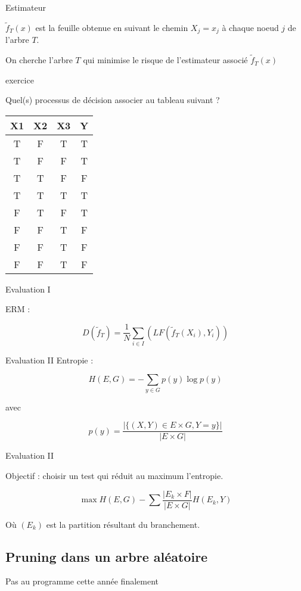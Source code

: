 \documentclass[11pt]{beamer}
\begin{document}
\begin{frame}{Estimateur}

$\tilde{f}_T(x)$ est la feuille obtenue en suivant le chemin $X_j=x_j$ à chaque noeud $j$ de l'arbre $T$.\\

\vspace{0.3cm}

On cherche l'arbre $T$ qui minimise le risque de l'estimateur associé $\tilde{f}_T(x)$

\end{frame}

\begin{frame}{exercice}

Quel(s) processus de décision associer au tableau suivant ?\\

\begin{center}
\vspace{0.2cm}
\begin{tabular}{|c|c|c|c|}
\hline
X1 & X2 & X3 & Y \\
\hline
T & F & T & T\\
T & F & F & T\\
T & T & F & F\\
T & T & T & T\\
F & T & F & T\\
F & F & T & F\\
F & F & T & F\\
F & F & T & F\\
\hline
\end{tabular}
\end{center}
\end{frame}

\begin{frame}{Evaluation I}

ERM : 

$$ D(\tilde{f}_T) = \frac{1}{N}\sum_{i \in I} \left( LF(\tilde{f}_T(X_i),Y_i) \right)$$

\end{frame}

\begin{frame}{Evaluation II}
Entropie :

$$ H(E,G) = - \sum_{y \in G}p(y)\log p(y)$$

avec 

$$p(y) = \frac{|\{(X,Y)\in E\times G,Y=y\}|}{|E\times G|}$$

\end{frame}

\begin{frame}{Evaluation II}

Objectif : choisir un test qui réduit au maximum l'entropie.

$$\max H(E,G) - \sum \frac{|E_k\times F|}{|E\times G|}H(E_k,Y)$$

Où $(E_k)$ est la partition résultant du branchement. 

\end{frame}

\subsection{Pruning dans un arbre aléatoire}

\begin{frame}{}
Pas au programme cette année finalement
\end{frame}
\end{document}
